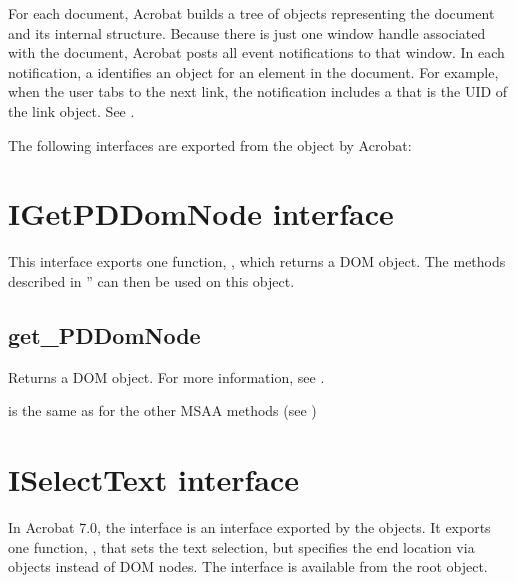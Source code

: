 \documentclass[letterpaper,12pt,english,openany,oneside]{sphinxmanual}
\begin{document}
For each document, Acrobat builds a tree of  objects representing the document and its internal structure. Because there is just one window handle associated with the document, Acrobat posts all event notifications to that window. In each notification, a  identifies an  object for an element in the document. For example, when the user tabs to the next link, the  notification includes a  that is the UID of the link object. See .

The following interfaces are exported from the  object by Acrobat:




\section{IGetPDDomNode interface}
\label{\detokenize{MSAA_PDF:igetpddomnode-interface}}
This interface exports one function,  , which returns a DOM object. The methods described in ” can then be used on this object.


\subsection{get\_PDDomNode}
\label{\detokenize{MSAA_PDF:get-pddomnode}}
Returns a DOM object. For more information, see .

 is the same as for the other MSAA methods (see )

\begin{sphinxVerbatim}[commandchars=\\\{\}]
 
 
 
\end{sphinxVerbatim}


\section{ISelectText interface}
\label{\detokenize{MSAA_PDF:iselecttext-interface}}
In Acrobat 7.0, the  interface is an interface exported by the  objects. It exports one function,  , that sets the text selection, but specifies the end location via  objects instead of DOM nodes. The  interface is available from the root  object.
\end{document}
